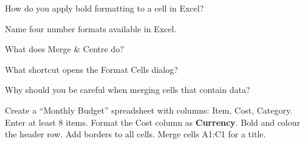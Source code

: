 \begin{reviewqs}
  \item How do you apply bold formatting to a cell in Excel?
  \item Name four number formats available in Excel.
  \item What does Merge \& Centre do?
  \item What shortcut opens the Format Cells dialog?
  \item Why should you be careful when merging cells that contain data?
\end{reviewqs}

\begin{challenge}
Create a ``Monthly Budget'' spreadsheet with columns: Item, Cost, Category. Enter at least 8 items. Format the Cost column as \textbf{Currency}. Bold and colour the header row. Add borders to all cells. Merge cells A1:C1 for a title.
\end{challenge}
